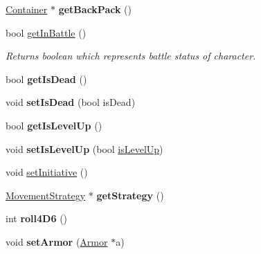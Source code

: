 \begin{DoxyCompactItemize}
\item 
\hypertarget{class_characters_ab95f371ea93eea0dca3fb3cd9aaaac7d}{}\label{class_characters_ab95f371ea93eea0dca3fb3cd9aaaac7d} 
\hyperlink{class_container}{Container} $\ast$ {\bfseries get\+Back\+Pack} ()
\item 
\hypertarget{class_characters_a2d6d1b6c6fbf0af1dabcbfe5a5975153}{}\label{class_characters_a2d6d1b6c6fbf0af1dabcbfe5a5975153} 
bool \hyperlink{class_characters_a2d6d1b6c6fbf0af1dabcbfe5a5975153}{get\+In\+Battle} ()
\begin{DoxyCompactList}\small\item\em Returns boolean which represents battle status of character. \end{DoxyCompactList}\item 
\hypertarget{class_characters_a626a12fc8378550885abce7ebadd9864}{}\label{class_characters_a626a12fc8378550885abce7ebadd9864} 
bool {\bfseries get\+Is\+Dead} ()
\item 
\hypertarget{class_characters_a15c05632c94af80d6edf17dcd044c6f9}{}\label{class_characters_a15c05632c94af80d6edf17dcd044c6f9} 
void {\bfseries set\+Is\+Dead} (bool is\+Dead)
\item 
\hypertarget{class_characters_a8eb0b2d6e53a4b0b56f8afce9a9b9371}{}\label{class_characters_a8eb0b2d6e53a4b0b56f8afce9a9b9371} 
bool {\bfseries get\+Is\+Level\+Up} ()
\item 
\hypertarget{class_characters_aec4cbbc7de57f0cb1f128fbd162b3246}{}\label{class_characters_aec4cbbc7de57f0cb1f128fbd162b3246} 
void {\bfseries set\+Is\+Level\+Up} (bool \hyperlink{class_characters_a9aa6aaad9efeee2713ebb94db9f9b63e}{is\+Level\+Up})
\item 
void \hyperlink{class_characters_a2e31bc19f7d2ce5d7da2ac9d62ae03e1}{set\+Initiative} ()
\item 
\hypertarget{class_characters_a7d8109f688d18ec5ca782970b755e426}{}\label{class_characters_a7d8109f688d18ec5ca782970b755e426} 
\hyperlink{class_movement_strategy}{Movement\+Strategy} $\ast$ {\bfseries get\+Strategy} ()
\item 
\hypertarget{class_characters_ae7c133d2a67e759db09084c6798c81fe}{}\label{class_characters_ae7c133d2a67e759db09084c6798c81fe} 
int {\bfseries roll4\+D6} ()
\item 
\hypertarget{class_characters_ad95f204f70f468bb5923f917018d6054}{}\label{class_characters_ad95f204f70f468bb5923f917018d6054} 
void {\bfseries set\+Armor} (\hyperlink{class_armor}{Armor} $\ast$a)
\item 
\hypertarget{class_characters_a93dd948b77ce686a0f8a97fa740584e1}{}\label{class_characters_a93dd948b77ce686a0f8a97fa740584e1} 

\end{DoxyCompactItemize}

